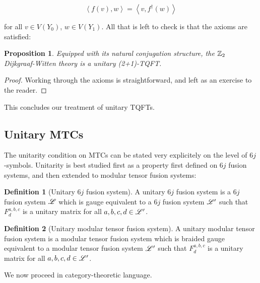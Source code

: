 \documentclass{article}
\newtheorem{proposition}{Proposition}[section]
\theoremstyle{definition}
\newtheorem*{definition}{Definition}
\numberwithin{figure}{section}
\begin{document}
$$\left<f(v),w\right>=\left<v,f^{\dagger}(w)\right>$$

for all $v\in V(Y_0)$, $w\in V(Y_1)$. All that is left to check is that the axioms are satisfied:

\begin{proposition} Equipped with its natural conjugation structure, the $\mathbb{Z}_2$ Dijkgraaf-Witten theory is a unitary (2+1)-TQFT.
\end{proposition}
\begin{proof} Working through the axioms is straightforward, and left as an exercise to the reader.
\end{proof}

This concludes our treatment of unitary TQFTs.

\subsection{Unitary MTCs}

The unitarity condition on MTCs can be stated very explicitely on the level of $6j$-symbols. Unitarity is best studied first as a property first defined on $6j$ fusion systems, and then extended to modular tensor fusion systems:

\begin{definition}[Unitary $6j$ fusion system] A unitary $6j$ fusion system is a $6j$ fusion system $\mathscr{L}$ which is gauge equivalent to a $6j$ fusion system $\mathscr{L}'$ such that $F^{a,b,c}_{d}$ is a unitary matrix for all $a,b,c,d\in \mathscr{L}'$.

\raggedleft\qedsymbol{}
\end{definition}


\begin{definition}[Unitary modular tensor fusion system] A unitary modular tensor fusion system is a modular tensor fusion system which is braided gauge equivalent to a modular tensor fusion system $\mathscr{L}'$ such that $F^{a,b,c}_{d}$ is a unitary matrix for all $a,b,c,d\in\mathscr{L}'$.

\raggedleft\qedsymbol{}
\end{definition}

We now proceed in category-theoretic language.
\end{document}
